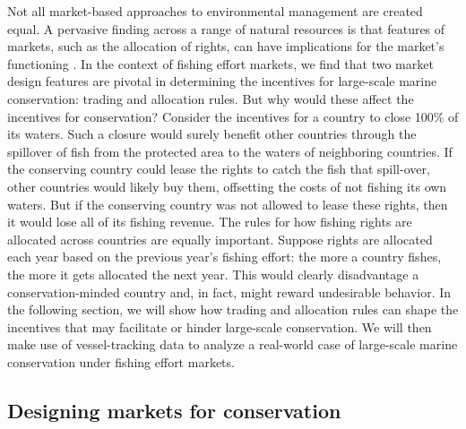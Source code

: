 \documentclass[12pt]{article}
\providecommand{\DIFaddtex}[1]{{\protect\color{blue}\uwave{#1}}} %
\providecommand{\DIFaddbegin}{} %
\providecommand{\DIFaddend}{} %
\providecommand{\DIFadd}[1]{\texorpdfstring{\DIFaddtex{#1}}{#1}} %
\newcommand{\DIFaddincludegraphics}[2][]{{\color{blue}\fbox{\DIFOincludegraphics[#1]{#2}}}} %
\DeclareRobustCommand{\DIFaddbegin}{\DIFOaddbegin \let\includegraphics\DIFaddincludegraphics} %
\DeclareRobustCommand{\DIFaddend}{\DIFOaddend \let\includegraphics\DIFOincludegraphics} %
\begin{document}
Not all market-based approaches to environmental management are created equal. A pervasive finding across a range of natural resources is that features of markets, such as the allocation of rights, can have implications for the market's functioning \cite{libecap_1989}. In the context of fishing effort markets, we find that two market design features are pivotal in determining the incentives for large-scale marine conservation: trading and allocation rules. But why would these \DIFaddbegin \DIFadd{design features of a fisheries market }\DIFaddend affect the incentives for conservation? Consider the incentives for a country to close 100\% of its waters. Such a closure would surely benefit other countries through the spillover of fish from the protected area to the waters of neighboring countries. If the conserving country could lease the rights to catch the fish that spill-over, other countries would likely buy them, offsetting the costs of not fishing its own waters. But if the conserving country was not allowed to lease these rights, then it would lose all of its fishing revenue. The rules for how fishing rights are allocated across countries are equally important. Suppose rights are allocated each year based on the previous year's fishing effort: the more a country fishes, the more it gets allocated the next year. This would clearly disadvantage a conservation-minded country and, in fact, might reward undesirable behavior. In the following section, we will show how trading and allocation rules can shape the incentives that may facilitate or hinder large-scale conservation. We will then make use of vessel-tracking data to analyze a real-world case of large-scale marine conservation under fishing effort markets.

\subsection{Designing markets for conservation}
\end{document}
